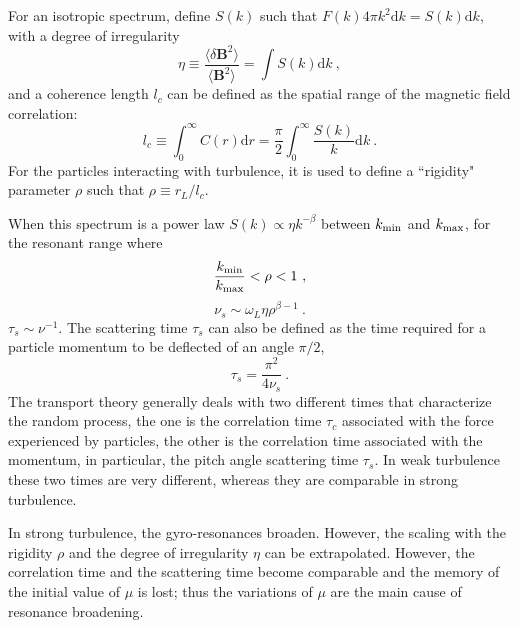 \documentclass[12pt,a4paper]{article}
\renewcommand{\vec}[1]{\boldsymbol{#1}}
\newcommand{\dif}{\mathrm{d}}
\begin{document}
For an isotropic spectrum, define $S(k)$ such that $F(k) 4\pi k^2 \dif k = S(k)\dif k$, with a degree of irregularity
\begin{equation}
\eta \equiv \frac{\langle \delta \vec{B}^2 \rangle}{\langle \vec{B}^2 \rangle} = \int S(k) \dif k ~,
\end{equation}
and a coherence length $l_c$ can be defined as the spatial range of the magnetic field  correlation:
\begin{equation}
l_c  \equiv \int_0^\infty C(r) \dif r = \frac{\pi}{2} \int_0^\infty \frac{S(k)}{k} \dif k ~.
\end{equation}
For the particles interacting with turbulence, it is used to define a ``rigidity" parameter $\rho$ such that $\rho \equiv r_L/l_c$.

When this spectrum is a power law $S(k) \propto \eta k^{-\beta}$ between $k_{\rm min}$ and $k_{\rm max}$, for the
resonant range where
\begin{equation}
\frac{k_{\rm min}}{k_{\rm max}} < \rho < 1 ~,
\end{equation}
\begin{equation}
\nu_s \sim \omega_L \eta \rho^{\beta-1} ~.
\end{equation}
$\tau_s \sim \nu^{-1}$. The scattering time $\tau_s$ can also be defined as the time required for a particle momentum to be deflected of an angle $\pi/2$, 
\begin{equation}
\tau_s = \frac{\pi^2}{4\nu_s} ~.
\end{equation}
The transport theory generally deals with two different times that characterize the random process, the one is the correlation time $\tau_c$ associated with the force experienced by particles, the other is the correlation time associated with the momentum, in particular, the pitch angle scattering time $\tau_s$. In weak turbulence these
two times are very different, whereas they are comparable in strong turbulence.

In strong turbulence, the gyro-resonances broaden. However, the scaling with the rigidity $\rho$ and the degree of irregularity $\eta$ can be extrapolated. However, the correlation time and the scattering time become comparable and the memory of the initial value of $\mu$ is lost; thus the variations of $\mu$ are the main cause of resonance broadening.
\end{document}
